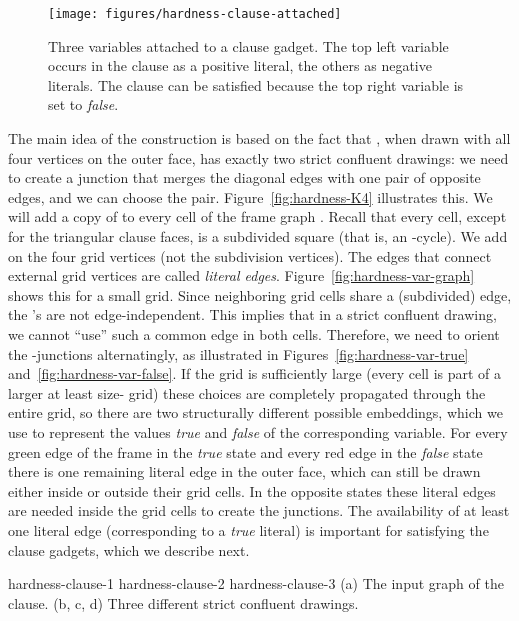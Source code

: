 \documentclass{llncs}
\begin{document}
\begin{wrapfigure}[18]{r}{0.4\textwidth}
\centering
    \texttt{[image: figures/hardness-clause-attached]}
	\caption{Three variables attached to a clause gadget. The top left variable occurs in the clause as a positive literal, the others as negative literals. The clause can be satisfied because the top right variable is set to \emph {false}.}
	\label{fig:hardness-clause-attached}
\end{wrapfigure}
The main idea of the construction is based on the fact that , when drawn with all four vertices on the outer face, has exactly two strict confluent drawings: we need to create a junction that merges the diagonal edges with one pair of opposite edges, and we can choose the pair.
Figure~\ref {fig:hardness-K4} illustrates this.
We will add a copy of  to every cell of the frame graph . Recall that every cell, except for the triangular clause faces, is a subdivided square (that is, an -cycle). We add  on the four grid vertices (not the subdivision vertices). The edges that connect external grid vertices are called \emph{literal edges}.
Figure~\ref {fig:hardness-var-graph} shows this for a small grid.
Since neighboring grid cells share a (subdivided) edge, the 's are not edge-independent. This implies that in a strict confluent drawing, we cannot ``use'' such a common edge in both cells. Therefore, we need to orient the -junctions alternatingly, as illustrated in Figures~\ref {fig:hardness-var-true} and~\ref {fig:hardness-var-false}.
If the grid is sufficiently large (every cell is part of a larger at least size- grid) these choices are completely propagated through the entire grid, so there are two structurally different possible embeddings,  which we use to represent the values \emph {true} and \emph {false} of the corresponding variable. For every green edge of the frame in the \emph{true} state and every red edge in the \emph{false} state there is one remaining literal edge in the outer face, which can still be drawn either inside or outside their grid cells. In the opposite states these literal edges are needed inside the grid cells to create the  junctions.  The availability of at least one literal edge (corresponding to a \emph{true} literal) is important for satisfying the clause gadgets, which we describe next.


 {hardness-clause-1} {hardness-clause-2} {hardness-clause-3}
{ (a) The input graph of the clause.
  (b, c, d) Three different strict confluent drawings.
}
\end{document}
